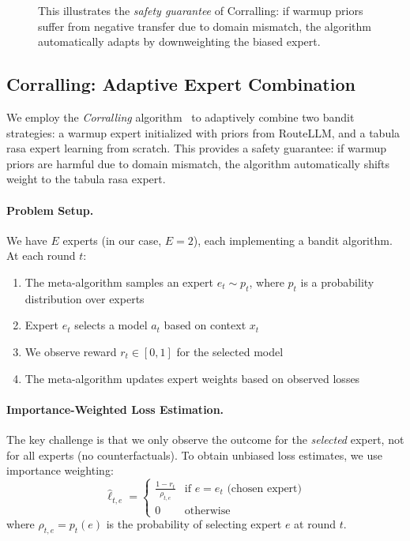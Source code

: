 \begin{figure}[t]
{%
This illustrates the \emph{safety guarantee} of Corralling: if warmup priors suffer from negative transfer due to domain mismatch, the algorithm automatically adapts by downweighting the biased expert.
}
\label{fig:corralling_semantic}
\end{figure}



\subsection{Corralling: Adaptive Expert Combination}
\label{sec:corralling}

We employ the \emph{Corralling} algorithm~\cite{agarwal2017corralling} to adaptively combine two bandit strategies:
a warmup expert initialized with priors from RouteLLM, and a tabula rasa expert learning from scratch.
This provides a safety guarantee: if warmup priors are harmful due to domain mismatch, the algorithm automatically shifts weight to the tabula rasa expert.

\paragraph{Problem Setup.}
We have $E$ experts (in our case, $E=2$), each implementing a bandit algorithm.
At each round $t$:
\begin{enumerate}[nosep]
    \item The meta-algorithm samples an expert $e_t \sim p_t$, where $p_t$ is a probability distribution over experts
    \item Expert $e_t$ selects a model $a_t$ based on context $x_t$
    \item We observe reward $r_t \in [0,1]$ for the selected model
    \item The meta-algorithm updates expert weights based on observed losses
\end{enumerate}

\paragraph{Importance-Weighted Loss Estimation.}
The key challenge is that we only observe the outcome for the \emph{selected} expert, not for all experts (no counterfactuals).
To obtain unbiased loss estimates, we use importance weighting:
\begin{equation}
\hat{\ell}_{t,e} = \begin{cases}
\frac{1 - r_t}{\rho_{t,e}} & \text{if } e = e_t \text{ (chosen expert)} \\
0 & \text{otherwise}
\end{cases}
\label{eq:importance_weighted_loss}
\end{equation}
where $\rho_{t,e} = p_t(e)$ is the probability of selecting expert $e$ at round $t$.

